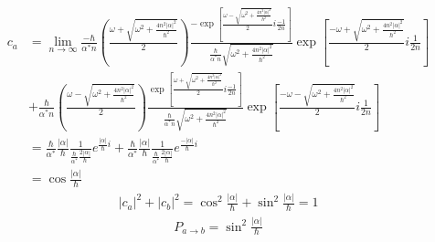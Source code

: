 \begin{align*}
    c_a & =
    \lim_{n\to\infty}
    \frac{-\hbar}{\alpha^* n }\left(\frac{\omega + \sqrt{\omega^2 + \frac{4n^2|\alpha|^2}{\hbar^2}}}{2} \right)
    \frac{-\exp\left[
            \frac{\omega - \sqrt{\omega^2 + \frac{4n^2|\alpha|^2}{\hbar^2}}}{2} i\frac{-1}{2n}
            \right]}
    {\frac{\hbar}{\alpha^* n}
        \sqrt{\omega^2 + \frac{4n^2|\alpha|^2}{\hbar^2}}}
    \exp\left[
            \frac{-\omega + \sqrt{\omega^2 + \frac{4n^2|\alpha|^2}{\hbar^2}}}{2} i\frac{1}{2n}
            \right] \\
        & +
    \frac{\hbar}{\alpha^* n }\left( \frac{\omega -\sqrt{\omega^2 + \frac{4n^2|\alpha|^2}{\hbar^2}}}{2}\right) \frac{\exp\left[
                                                                                                                      \frac{\omega + \sqrt{\omega^2 + \frac{4n^2|\alpha|^2}{\hbar^2}}}{2} i\frac{-1}{2n}
                                                                                                                      \right]   }{\frac{\hbar}{\alpha^* n}
                                                                                                                  \sqrt{\omega^2 + \frac{4n^2|\alpha|^2}{\hbar^2}}}\exp\left[
                                                                                                                                                                           \frac{-\omega -\sqrt{\omega^2 + \frac{4n^2|\alpha|^2}{\hbar^2}}}{2}i\frac{1}{2n}
                                                                                                                                                                           \right]
    \\& =
    \frac{\hbar}{\alpha^*}
    \frac{ |\alpha|}{\hbar}
    \frac{1}{\frac{\hbar}{\alpha^*}\frac{2|\alpha|}{\hbar}}
    e^{\frac{|\alpha|}{\hbar}i}
    +
    \frac{\hbar}{\alpha^*}
    \frac{ |\alpha|}{\hbar}
    \frac{1}{\frac{\hbar}{\alpha^*}\frac{2|\alpha|}{\hbar}}
    e^{\frac{-|\alpha|}{\hbar}i} \\
        & =
    \cos\frac{|\alpha|}{\hbar}
\end{align*}
\begin{align*}
    |c_a|^2 + |c_b|^2 = \cos^2\frac{|\alpha|}{\hbar} + \sin^2\frac{|\alpha|}{\hbar} = 1
\end{align*}
\begin{align*}
    P_{a\to b} = \sin^2\frac{|\alpha|}{\hbar}
\end{align*}

